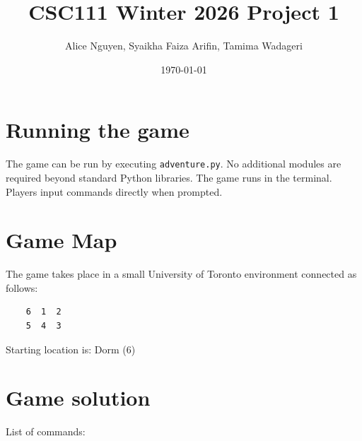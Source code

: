 \documentclass[11pt]{article}
\title{CSC111 Winter 2026 Project 1}
\author{Alice Nguyen, Syaikha Faiza Arifin, Tamima Wadageri}
\date{\today}
\begin{document}
\maketitle

\section*{Running the game}
The game can be run by executing \texttt{adventure.py}. No additional modules are required beyond standard Python libraries. The game runs in the terminal. Players input commands directly when prompted.

\section*{Game Map}
The game takes place in a small University of Toronto environment connected as follows:

\begin{verbatim}
    6  1  2
    5  4  3
\end{verbatim}

Starting location is: Dorm (6)

\section*{Game solution}

List of commands:
\end{document}
